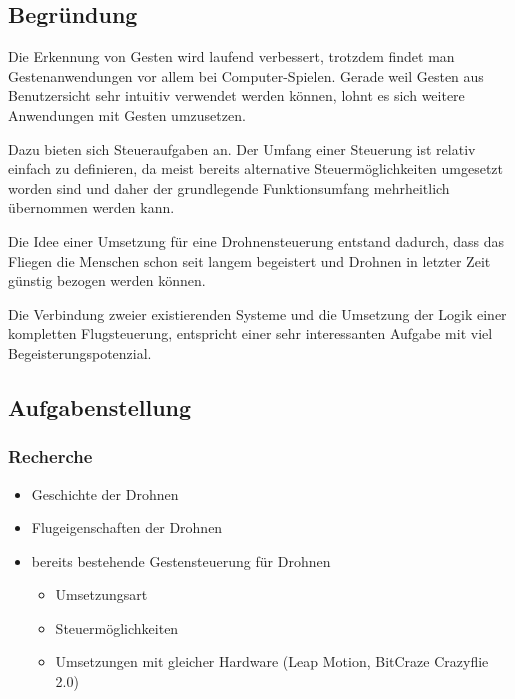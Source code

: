 \subsection{Begründung}
Die Erkennung von Gesten wird laufend verbessert, trotzdem findet man Gestenanwendungen vor allem bei Computer-Spielen.
Gerade weil Gesten aus Benutzersicht sehr intuitiv verwendet werden können, lohnt es sich weitere Anwendungen mit Gesten umzusetzen.

Dazu bieten sich Steueraufgaben an.
Der Umfang einer Steuerung ist relativ einfach zu definieren, da meist bereits alternative Steuermöglichkeiten umgesetzt worden sind und daher der grundlegende Funktionsumfang mehrheitlich übernommen werden kann.

Die Idee einer Umsetzung für eine Drohnensteuerung entstand dadurch, dass das Fliegen die Menschen schon seit langem begeistert und Drohnen in letzter Zeit günstig bezogen werden können.

Die Verbindung zweier existierenden Systeme und die Umsetzung der Logik einer kompletten Flugsteuerung, entspricht einer sehr interessanten Aufgabe mit viel Begeisterungspotenzial.


\subsection{Aufgabenstellung}
\subsubsection{Recherche}
\begin{itemize}
	\item Geschichte der Drohnen
	\item Flugeigenschaften der Drohnen
	\item bereits bestehende Gestensteuerung für Drohnen
	\begin{itemize}
		\item Umsetzungsart
		\item Steuermöglichkeiten
		\item Umsetzungen mit gleicher Hardware (Leap Motion, BitCraze Crazyflie 2.0)
	\end{itemize}
\end{itemize}



